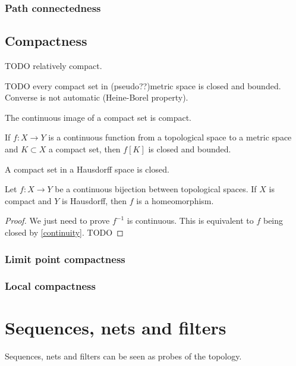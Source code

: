 \subsection{Path connectedness}

\section{Compactness}
TODO relatively compact.

TODO every compact set in (pseudo??)metric space is closed and bounded. Converse is not automatic (Heine-Borel property).

\begin{proposition} \label{imageCompactIsCompact}
The continuous image of a compact set is compact.
\end{proposition}
\begin{corollary} \label{imageCompactIsClosedBounded}
If $f:X\to Y$ is a continuous function from a topological space to a metric space and $K\subset X$ a compact set, then $f[K]$ is closed and bounded.
\end{corollary}

\begin{proposition}
A compact set in a Hausdorff space is closed.
\end{proposition}

\begin{proposition} \label{compactToHausdorffHomeomorphism}
Let $f:X\to Y$ be a continuous bijection between topological spaces. If $X$ is compact and $Y$ is Hausdorff, then $f$ is a homeomorphism.
\end{proposition}
\begin{proof}
We just need to prove $f^{-1}$ is continuous. This is equivalent to $f$ being closed by \ref{continuity}. TODO
\end{proof}



\subsection{Limit point compactness}
\subsection{Local compactness}






\chapter{Sequences, nets and filters}
Sequences, nets and filters can be seen as probes of the topology.

